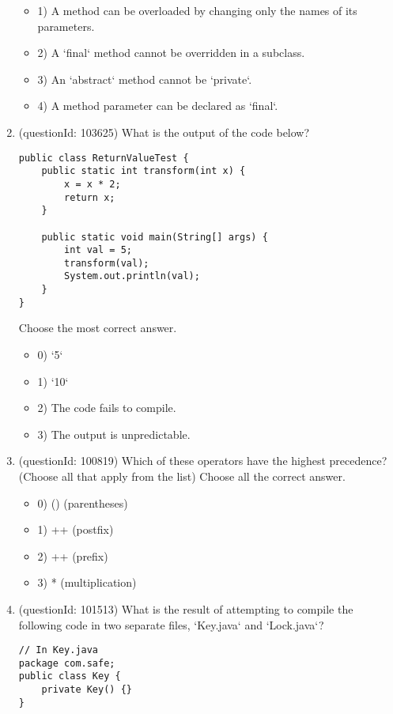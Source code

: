 \documentclass[12pt]{article}
\begin{document}
\begin{enumerate}[label=(\arabic*)]
\begin{itemize}
\item 1) A method can be overloaded by changing only the names of its parameters.

\item 2) A `final` method cannot be overridden in a subclass.

\item 3) An `abstract` method cannot be `private`.

\item 4) A method parameter can be declared as `final`.

\end{itemize}
\item (questionId: 103625) What is the output of the code below?
\begin{verbatim}
public class ReturnValueTest {
    public static int transform(int x) {
        x = x * 2;
        return x;
    }

    public static void main(String[] args) {
        int val = 5;
        transform(val);
        System.out.println(val);
    }
}
\end{verbatim}
Choose the most correct answer. 
\begin{itemize}
\item 0) `5`

\item 1) `10`

\item 2) The code fails to compile.

\item 3) The output is unpredictable.

\end{itemize}
\item (questionId: 100819) Which of these operators have the highest precedence? (Choose all that apply from the list)
Choose all the correct answer.\begin{itemize}
\item 0) () (parentheses)

\item 1) ++ (postfix)

\item 2) ++ (prefix)

\item 3) * (multiplication)

\end{itemize}
\item (questionId: 101513) What is the result of attempting to compile the following code in two separate files, `Key.java` and `Lock.java`?\n\begin{verbatim}
// In Key.java
package com.safe;
public class Key {
    private Key() {}
}


\end{verbatim}
\end{enumerate}
\end{document}
